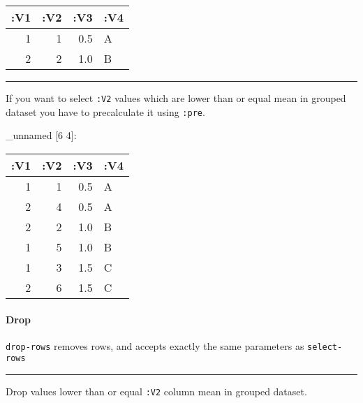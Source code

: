 \documentclass[]{article}
\newenvironment{Shaded}{\begin{snugshade}}{\end{snugshade}}
\newcommand{\KeywordTok}[1]{\textcolor[rgb]{0.13,0.29,0.53}{\textbf{#1}}}
\newcommand{\VariableTok}[1]{\textcolor[rgb]{0.00,0.00,0.00}{#1}}
\newcommand{\AttributeTok}[1]{\textcolor[rgb]{0.77,0.63,0.00}{#1}}
\newcommand{\NormalTok}[1]{#1}
\let\oldparagraph\paragraph
\renewcommand{\paragraph}[1]{\oldparagraph{#1}\mbox{}}
\begin{document}
\begin{longtable}[]{@{}rrrl@{}}
\toprule
:V1 & :V2 & :V3 & :V4\tabularnewline
\midrule
\endhead
1 & 1 & 0.5 & A\tabularnewline
2 & 2 & 1.0 & B\tabularnewline
\bottomrule
\end{longtable}

\begin{center}\rule{0.5\linewidth}{0.5pt}\end{center}

If you want to select \texttt{:V2} values which are lower than or equal
mean in grouped dataset you have to precalculate it using \texttt{:pre}.

\begin{Shaded}
\end{Shaded}

\_unnamed {[}6 4{]}:

\begin{longtable}[]{@{}rrrl@{}}
\toprule
:V1 & :V2 & :V3 & :V4\tabularnewline
\midrule
\endhead
1 & 1 & 0.5 & A\tabularnewline
2 & 4 & 0.5 & A\tabularnewline
2 & 2 & 1.0 & B\tabularnewline
1 & 5 & 1.0 & B\tabularnewline
1 & 3 & 1.5 & C\tabularnewline
2 & 6 & 1.5 & C\tabularnewline
\bottomrule
\end{longtable}

\paragraph{Drop}\label{drop-1}

\texttt{drop-rows} removes rows, and accepts exactly the same parameters
as \texttt{select-rows}

\begin{center}\rule{0.5\linewidth}{0.5pt}\end{center}

Drop values lower than or equal \texttt{:V2} column mean in grouped
dataset.

\begin{Shaded}
\end{Shaded}
\end{document}
